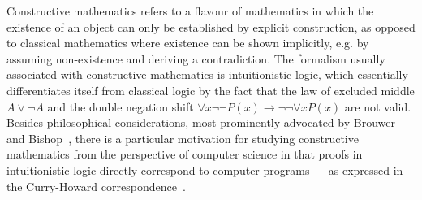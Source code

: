 \documentclass[runningheads]{llncs}
\begin{document}
Constructive mathematics refers to a flavour of mathematics in which the existence of an object can only be established by explicit construction, as opposed to classical mathematics where existence can be shown implicitly, e.g. by assuming non-existence and deriving a contradiction.
The formalism usually associated with constructive mathematics is intuitionistic logic, which essentially differentiates itself from classical logic by the fact that the law of excluded middle $A\vee\neg A$ and the double negation shift $\forall x\neg\neg P(x)\to\neg\neg\forall xP(x)$ are not valid.
Besides philosophical considerations, most prominently advocated by Brouwer~\cite{brouwer1907over} and Bishop~\cite{bishop1967foundations}, there is a particular motivation for studying constructive mathematics from the perspective of computer science in that proofs in  intuitionistic logic directly correspond to computer programs --- as expressed in the Curry-Howard correspondence~\cite{howard1980formulae}.
\end{document}
